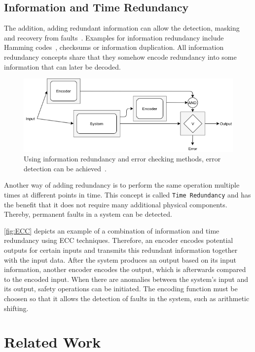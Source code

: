 \subsection{Information and Time Redundancy}
The addition, adding redundant information can allow the detection, masking and recovery from faults~\cite{BarryFaultToleranceAnalysis}.
Examples for information redundancy include Hamming codes~\cite{HammingCodes}, checksums or information duplication.
All information redundancy concepts share that they somehow encode redundancy into some information that can later be decoded.

\begin{figure}[!hb]
	\centering
	\includegraphics[width=0.75\linewidth]{images/ECC}
	\caption{Using information redundancy and error checking methods, error detection can be achieved~\cite{Su2005ECC}.}
	\label{fig:ECC}
\end{figure}

Another way of adding redundancy is to perform the same operation multiple times at different points in time.
This concept is called \texttt{Time Redundancy} and has the benefit that it does not require many additional physical components.
Thereby, permanent faults in a system can be detected.

\autoref{fig:ECC} depicts an example of a combination of information and time redundancy using \gls*{ECC} techniques.
Therefore, an encoder encodes potential outputs for certain inputs and transmits this redundant information together with the input data.
After the system produces an output based on its input information, another encoder encodes the output, which is afterwards compared to the encoded input.
When there are anomalies between the system's input and its output, safety operations can be initiated.
The encoding function must be choosen so that it allows the detection of faults in the system, such as arithmetic shifting.

\section{Related Work}


